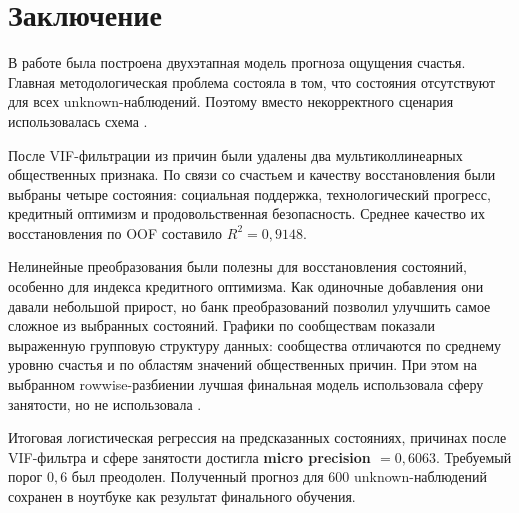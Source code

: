 \section*{Заключение}

В работе была построена двухэтапная модель прогноза ощущения счастья. Главная
методологическая проблема состояла в том, что состояния отсутствуют для всех
unknown-наблюдений. Поэтому вместо некорректного сценария
 использовалась схема
.

После VIF-фильтрации из причин были удалены два мультиколлинеарных общественных
признака. По связи со счастьем и качеству восстановления были выбраны четыре
состояния: социальная поддержка, технологический прогресс, кредитный оптимизм и
продовольственная безопасность. Среднее качество их восстановления по OOF
составило $R^2 = 0{,}9148$.

Нелинейные преобразования были полезны для восстановления состояний, особенно
для индекса кредитного оптимизма. Как одиночные добавления они давали небольшой
прирост, но банк преобразований позволил улучшить самое сложное из выбранных
состояний. Графики по сообществам показали выраженную групповую структуру
данных: сообщества отличаются по среднему уровню счастья и по областям значений
общественных причин. При этом на выбранном rowwise-разбиении лучшая финальная
модель использовала сферу занятости, но не использовала .

Итоговая логистическая регрессия на предсказанных состояниях, причинах после
VIF-фильтра и сфере занятости достигла
\textbf{micro precision $=0{,}6063$}. Требуемый порог $0{,}6$ был преодолен.
Полученный прогноз для 600 unknown-наблюдений сохранен в ноутбуке как результат
финального обучения.
